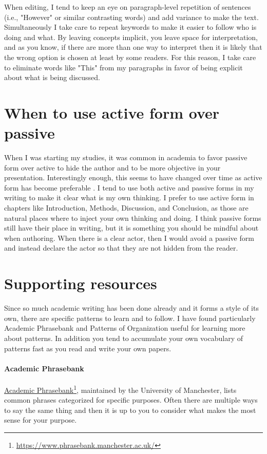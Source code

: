 When editing, I tend to keep an eye on paragraph-level repetition of sentences (i.e., "However" or similar contrasting words) and add variance to make the text.
Simultaneously I take care to repeat keywords to make it easier to follow who is doing and what.
By leaving concepts implicit, you leave space for interpretation, and as you know, if there are more than one way to interpret then it is likely that the wrong option is chosen at least by some readers.
For this reason, I take care to eliminate words like "This" from my paragraphs in favor of being explicit about what is being discussed.

\section{When to use active form over passive}

When I was starting my studies, it was common in academia to favor passive form over active to hide the author and to be more objective in your presentation.
Interestingly enough, this seems to have changed over time as active form has become preferable \citep{ryba2021better}.
I tend to use both active and passive forms in my writing to make it clear what is my own thinking.
I prefer to use active form in chapters like Introduction, Methods, Discussion, and Conclusion, as those are natural places where to inject your own thinking and doing.
I think passive forms still have their place in writing, but it is something you should be mindful about when authoring.
When there is a clear actor, then I would avoid a passive form and instead declare the actor so that they are not hidden from the reader.

\section{Supporting resources}

Since so much academic writing has been done already and it forms a style of its own, there are specific patterns to learn and to follow.
I have found particularly Academic Phrasebank and Patterns of Organization useful for learning more about patterns.
In addition you tend to accumulate your own vocabulary of patterns fast as you read and write your own papers.

\paragraph{Academic Phrasebank}
\href{https://www.phrasebank.manchester.ac.uk/}{Academic Phrasebank}\footnote{\url{https://www.phrasebank.manchester.ac.uk/}}, maintained by the University of Manchester, lists common phrases categorized for specific purposes.
Often there are multiple ways to say the same thing and then it is up to you to consider what makes the most sense for your purpose.

